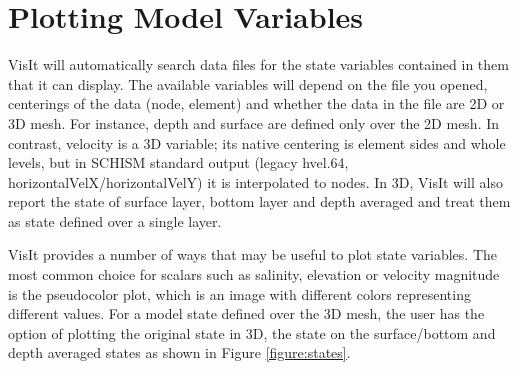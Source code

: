 \documentclass[12pt]{report}
\begin{document}
  \section{Plotting Model Variables}\label{subsection:viewstate}
     VisIt will automatically search data files for the state variables contained in them that it can display. 
		 The available variables will depend on the file you opened, centerings of the data (node, element) 
		 and whether the data in the file are 2D or 3D mesh. For instance, depth and surface are defined only over the 2D mesh.
		 In contrast, velocity is a 3D variable; its native centering is element sides and whole levels, but 
		 in SCHISM standard output (legacy hvel.64, horizontalVelX/horizontalVelY) it is interpolated to nodes. In 3D, VisIt will also report the state of surface layer, bottom layer and
     depth averaged and treat them as state defined over a single layer.
     
     VisIt provides a number of ways that may be useful to plot state variables. The most common choice for
		 scalars such as salinity, elevation or velocity magnitude is the pseudocolor plot, which is an image with different colors
		 representing different values. For a model state defined over the 3D mesh, the user has the option of plotting the 
		 original state in 3D, the state on the surface/bottom and depth averaged states as shown in Figure \ref{figure:states}.
     
\end{document}
